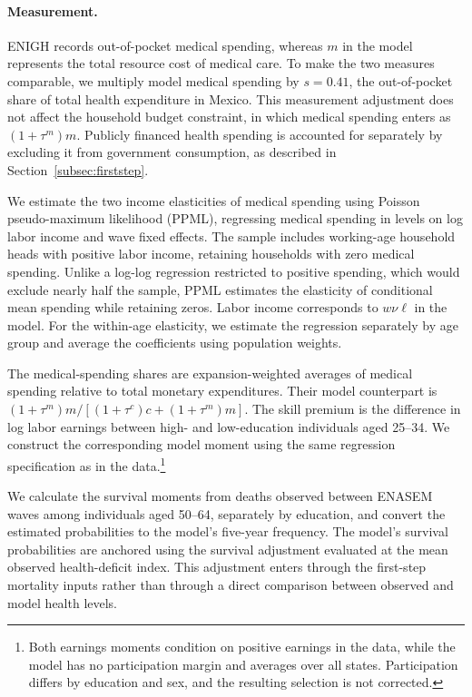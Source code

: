 \documentclass[12pt,a4paper]{article}
\begin{document}
\paragraph{Measurement.}
ENIGH records out-of-pocket medical spending, whereas $m$ in the model represents the total resource cost of medical care. To make the two measures comparable, we multiply model medical spending by $s=0.41$, the out-of-pocket share of total health expenditure in Mexico. This measurement adjustment does not affect the household budget constraint, in which medical spending enters as $(1+\tau^m)m$. Publicly financed health spending is accounted for separately by excluding it from government consumption, as described in Section~\ref{subsec:firststep}.

We estimate the two income elasticities of medical spending using Poisson pseudo-maximum likelihood (PPML), regressing medical spending in levels on log labor income and wave fixed effects. The sample includes working-age household heads with positive labor income, retaining households with zero medical spending. Unlike a log-log regression restricted to positive spending, which would exclude nearly half the sample, PPML estimates the elasticity of conditional mean spending while retaining zeros. Labor income corresponds to $w\nu\ell$ in the model. For the within-age elasticity, we estimate the regression separately by age group and average the coefficients using population weights.

The medical-spending shares are expansion-weighted averages of medical spending relative to total monetary expenditures. Their model counterpart is $(1+\tau^m)m/[(1+\tau^c)c+(1+\tau^m)m]$. The skill premium is the difference in log labor earnings between high- and low-education individuals aged 25--34. We construct the corresponding model moment using the same regression specification as in the data.\footnote{Both earnings moments condition on positive earnings in the data, while the model has no participation margin and averages over all states. Participation differs by education and sex, and the resulting selection is not corrected.}

We calculate the survival moments from deaths observed between ENASEM waves among individuals aged 50--64, separately by education, and convert the estimated probabilities to the model's five-year frequency. The model's survival probabilities are anchored using the survival adjustment evaluated at the mean observed health-deficit index. This adjustment enters through the first-step mortality inputs rather than through a direct comparison between observed and model health levels.
\end{document}
